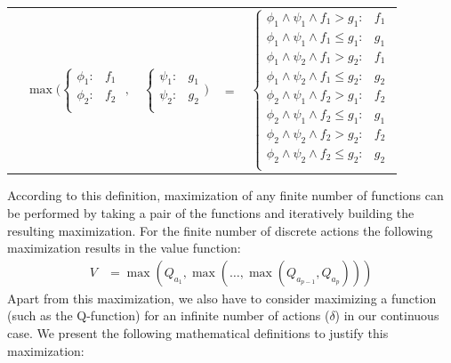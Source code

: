 \documentclass[letterpaper]{article}
\renewcommand{\-}{\text{-}}
\begin{document}
{\footnotesize
\begin{center}
\begin{tabular}{r c c c l}
&
\hspace{-9mm} $\max \Bigg(
  \begin{cases}
    \phi_1: & f_1 \\ 
    \phi_2: & f_2 \\ 
  \end{cases}$
$,$
&
\hspace{-4mm}
  $\begin{cases}
    \psi_1: & g_1 \\ 
    \psi_2: & g_2 \\ 
  \end{cases} \Bigg)$
&
\hspace{-4mm} 
$ = $
&
\hspace{-4mm}
  $\begin{cases}
  \phi_1 \wedge \psi_1 \wedge f_1 > g_1    : & f_1 \\ 
  \phi_1 \wedge \psi_1 \wedge f_1 \leq g_1 : & g_1 \\ 
  \phi_1 \wedge \psi_2 \wedge f_1 > g_2    : & f_1 \\ 
  \phi_1 \wedge \psi_2 \wedge f_1 \leq g_2 : & g_2 \\ 
  \phi_2 \wedge \psi_1 \wedge f_2 > g_1    : & f_2 \\ 
  \phi_2 \wedge \psi_1 \wedge f_2 \leq g_1 : & g_1 \\ 
  \phi_2 \wedge \psi_2 \wedge f_2 > g_2    : & f_2 \\ 
  \phi_2 \wedge \psi_2 \wedge f_2 \leq g_2 : & g_2 \\ 
  \end{cases}$
\end{tabular}
\end{center}
}

According to this definition, maximization of any finite number of functions can be performed by taking a pair of the functions and iteratively building the resulting maximization. For the finite number of discrete actions the following maximization results in the value function: 
\begin{align*}
V & = 
\max(Q_{a_1},\max(\ldots,\max(Q_{a_{p-1}},Q_{a_p})))
\end{align*}
Apart from this maximization, we also have to consider maximizing a function (such as the Q-function) for an infinite number of actions ($\delta$) in our continuous case. 
We present the following mathematical definitions to justify this maximization:\\
\end{document}
